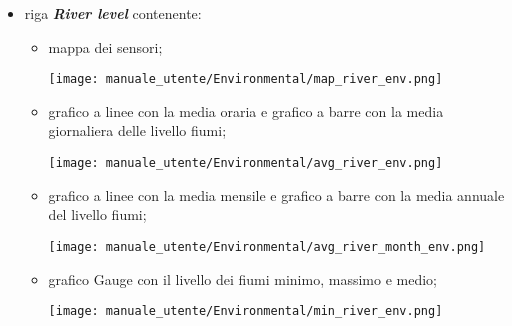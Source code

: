 \begin{itemize}
    \item riga \textit{\textbf{River level}} contenente:
    \begin{itemize}
        \item mappa dei sensori;
        \begin{center}
            \texttt{[image: manuale\_utente/Environmental/map\_river\_env.png]}
        \end{center}
        \item grafico a linee con la media oraria e grafico a barre con la media giornaliera delle livello fiumi;
        \begin{center}
            \texttt{[image: manuale\_utente/Environmental/avg\_river\_env.png]}
        \end{center}
        \item grafico a linee con la media mensile e grafico a barre con la media annuale del livello fiumi;
        \begin{center}
            \texttt{[image: manuale\_utente/Environmental/avg\_river\_month\_env.png]}
        \end{center}
        \item grafico Gauge con il livello dei fiumi minimo, massimo e medio;
        \begin{center}
            \texttt{[image: manuale\_utente/Environmental/min\_river\_env.png]}
        \end{center}
    \end{itemize}


\end{itemize}
